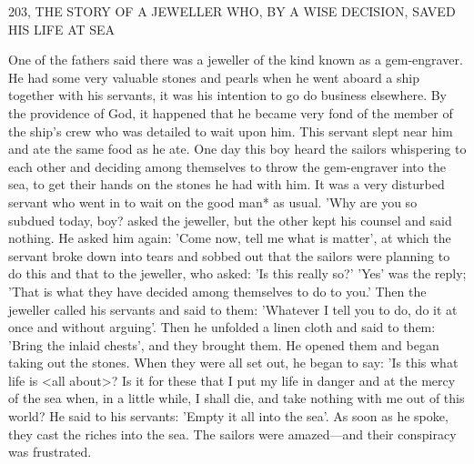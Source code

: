 203, THE STORY OF A JEWELLER WHO,
BY A WISE DECISION, SAVED HIS LIFE AT SEA

One of the fathers said there was a jeweller of the kind known as a
gem-engraver. He had some very valuable stones and pearls when
he went aboard a ship together with his servants, it was his
intention to go do business elsewhere. By the providence of God, it
happened that he became very fond of the member of the ship's
crew who was detailed to wait upon him. This servant slept near
him and ate the same food as he ate. One day this boy heard the
sailors whispering to each other and deciding among themselves to
throw the gem-engraver into the sea, to get their hands on the
stones he had with him. It was a very disturbed servant who went
in to wait on the good man* as usual. 'Why are you so subdued
today, boy? asked the jeweller, but the other kept his counsel and
said nothing. He asked him again: 'Come now, tell me what is
matter', at which the servant broke down into tears and sobbed out
that the sailors were planning to do this and that to the jeweller,
who asked: 'Is this really so?' 'Yes' was the reply; 'That is what they
have decided among themselves to do to you.' Then the jeweller
called his servants and said to them: 'Whatever I tell you to do, do
it at once and without arguing'. Then he unfolded a linen cloth and
said to them: 'Bring the inlaid chests', and they brought them. He
opened them and began taking out the stones. When they were all
set out, he began to say: 'Is this what life is <all about>? Is it for
these that I put my life in danger and at the mercy of the sea when,
in a little while, I shall die, and take nothing with me out of this
world? He said to his servants: 'Empty it all into the sea'. As soon
as he spoke, they cast the riches into the sea. The sailors were
amazed—and their conspiracy was frustrated.

